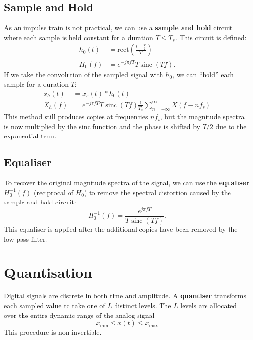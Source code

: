 \documentclass{article}
\DeclareMathOperator{\sinc}{sinc}
\begin{document}
\subsection{Sample and Hold}
As an impulse train is not practical, we can use a \textbf{sample and hold} circuit where each sample
is held constant for a duration \(T \leq T_s\). This circuit is defined:
\begin{align*}
    h_0\left( t \right) & = \mathrm{rect}\left( \frac{t - \frac{T}{2}}{T} \right) \\
    H_0\left( f \right) & = e^{-j \pi f T} T \sinc{\left( T f \right)}.
\end{align*}
If we take the convolution of the sampled signal with \(h_0\), we can ``hold'' each sample for a duration \(T\):
\begin{align*}
    x_h\left( t \right) & = x_s\left( t \right) * h_0\left( t \right)                                                                   \\
    X_h\left( f \right) & = e^{-j \pi f T} T \sinc{\left( T f \right)} \frac{1}{T_s} \sum_{n = -\infty}^\infty X\left( f - nf_s \right)
\end{align*}
This method still produces copies at frequencies \(n f_s\), but
the magnitude spectra is now multiplied by the sinc function and the phase is shifted by \(T/2\) due to the exponential term.
\subsection{Equaliser}
To recover the original magnitude spectra of the signal, we can use the \textbf{equaliser} \(H_0^{-1}\left( f \right)\) (reciprocal of \(H_0\))
to remove the spectral distortion caused by the sample and hold circuit:
\begin{equation*}
    H_0^{-1}\left( f \right) = \frac{e^{j \pi f T}}{T \sinc{\left( T f \right)}}.
\end{equation*}
This equaliser is applied after the additional copies have been removed by the low-pass filter.
\section{Quantisation}
Digital signals are discrete in both time and amplitude. A
\textbf{quantiser} transforms each sampled value to take one of \(L\) distinct levels.
The \(L\) levels are allocated over the entire dynamic range of the analog signal
\begin{equation*}
    x_\mathrm{min} \leq x\left( t \right) \leq x_\mathrm{max}
\end{equation*}
This procedure is non-invertible.
\end{document}
